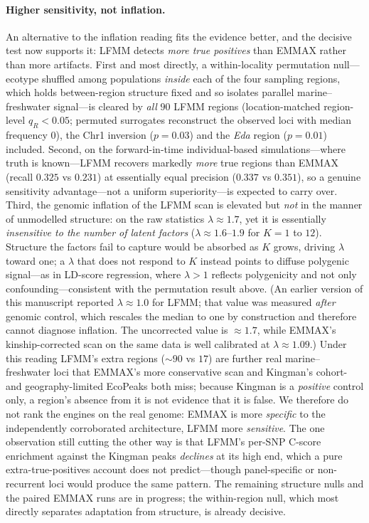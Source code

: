 \documentclass[11pt]{article}
\begin{document}
\paragraph{Higher sensitivity, not inflation.}
An alternative to the inflation reading fits the evidence better, and the decisive test
now supports it: LFMM detects \emph{more true positives} than EMMAX rather than more
artifacts. First and most directly, a within-locality permutation null---ecotype shuffled
among populations \emph{inside} each of the four sampling regions, which holds
between-region structure fixed and so isolates parallel marine--freshwater signal---is
cleared by \emph{all} $90$ LFMM regions (location-matched region-level $q_R < 0.05$;
permuted surrogates reconstruct the observed loci with median frequency $0$), the Chr1
inversion ($p = 0.03$) and the \emph{Eda} region ($p = 0.01$) included. Second, on the
forward-in-time individual-based simulations---where truth is known---LFMM recovers markedly \emph{more} true
regions than EMMAX (recall $0.325$ vs $0.231$) at essentially equal precision ($0.337$
vs $0.351$), so a genuine sensitivity advantage---not a uniform superiority---is
expected to carry over. Third, the genomic inflation of the LFMM scan is elevated but \emph{not} in
the manner of unmodelled structure: on the raw statistics $\lambda \approx 1.7$, yet it is
essentially \emph{insensitive to the number of latent factors} ($\lambda \approx
1.6$--$1.9$ for $K = 1$ to $12$). Structure the factors fail to capture would be absorbed
as $K$ grows, driving $\lambda$ toward one; a $\lambda$ that does not respond to $K$
instead points to diffuse polygenic signal---as in LD-score regression, where $\lambda >
1$ reflects polygenicity and not only confounding---consistent with the permutation result
above. (An earlier version of this manuscript reported $\lambda \approx 1.0$ for LFMM;
that value was measured \emph{after} genomic control, which rescales the median to one by
construction and therefore cannot diagnose inflation. The uncorrected value is $\approx
1.7$, while EMMAX's kinship-corrected scan on the same data is well calibrated at $\lambda
\approx 1.09$.) Under this reading LFMM's extra regions (${\sim}90$ vs $17$) are further
real marine--freshwater loci that EMMAX's more conservative scan and Kingman's cohort- and
geography-limited EcoPeaks both miss; because Kingman is a \emph{positive} control only, a
region's absence from it is not evidence that it is false. We therefore do not rank the
engines on the real genome: EMMAX is more \emph{specific} to the independently corroborated
architecture, LFMM more \emph{sensitive}. The one observation still cutting the other way
is that LFMM's per-SNP C-score enrichment against the Kingman peaks \emph{declines} at its
high end, which a pure extra-true-positives account does not predict---though
panel-specific or non-recurrent loci would produce the same pattern. The remaining
structure nulls and the paired EMMAX runs are in progress; the within-region null, which
most directly separates adaptation from structure, is already decisive.
\end{document}
